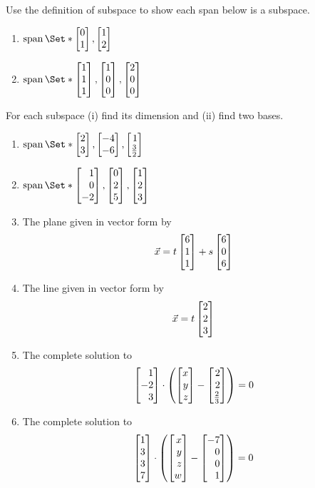 \begin{exercises}
\begin{problist}
		\prob Use the definition of subspace to show each span below is a subspace.
		\begin{enumerate}
			\item $\Span\Set*{\mat{0\\1}, \mat{1\\2}}$
			\item $\Span\Set*{\mat{1\\1\\1}, \mat{1\\0\\0}, \mat{2\\0\\0}}$
		\end{enumerate}

		\prob For each subspace (i) find its dimension and (ii) find two bases.
		\begin{enumerate}
			\item $\Span\Set*{\mat{2\\3}, \mat{-4\\-6}, \mat{1\\\frac{3}{2}}}$
			\item $\Span\Set*{\mat{1\\0\\-2}, \mat{0\\2\\5}, \mat{1\\2\\3}}$
			\item The plane given in vector form by
			\[
				\vec x = t\mat{6\\1\\1}+s\mat{6\\0\\6}
			\]
			\item The line given in vector form by
			\[
				\vec x = t\mat{2\\2\\3}
			\]
			\item The complete solution to
			\[
				\mat{1\\-2\\3} \cdot \left(\mat{x\\y\\z}-\mat{2\\2\\\frac{2}{3}}\right)=0
			\]
			\item The complete solution to
			\[
				\mat{1\\3\\3\\7} \cdot \left(\mat{x\\y\\z\\w}-\mat{-7\\0\\0\\1}\right)=0
			\]
		\end{enumerate}


\end{problist}
\end{exercises}
